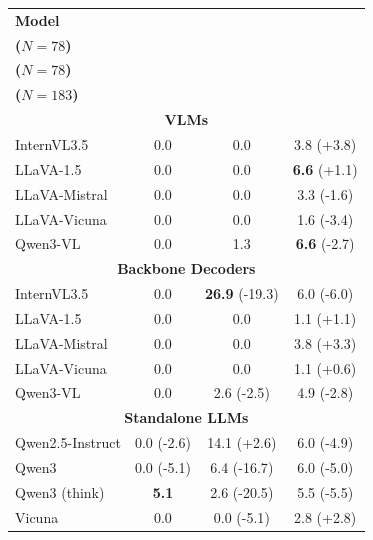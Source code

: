 \begin{center}
\small
\setlength{\tabcolsep}{3.5pt}
\renewcommand{\arraystretch}{0.93}
\begin{tabular}{lccc}
\toprule
\textbf{Model}
  & \makecell[c]{\textbf{Yes/No} \\ \textbf{($N{=}78$)}}
  & \makecell[c]{\textbf{Count} \\ \textbf{($N{=}78$)}}
  & \makecell[c]{\textbf{Free Text} \\ \textbf{($N{=}183$)}} \\
\midrule
\multicolumn{4}{c}{\textbf{VLMs}} \\
\midrule
InternVL3.5          & 0.0 & 0.0 & 3.8 {(\textcolor[HTML]{CC7A00}{+3.8})} \\
LLaVA-1.5            & 0.0 & 0.0 & \textbf{6.6} {(\textcolor[HTML]{CC7A00}{+1.1})} \\
LLaVA-Mistral        & 0.0 & 0.0 & 3.3 {(\textcolor[HTML]{0072B2}{-1.6})} \\
LLaVA-Vicuna         & 0.0 & 0.0 & 1.6 {(\textcolor[HTML]{0072B2}{-3.4})} \\
Qwen3-VL             & 0.0 & 1.3 & \textbf{6.6} {(\textcolor[HTML]{0072B2}{-2.7})} \\
\midrule
\multicolumn{4}{c}{\textbf{Backbone Decoders}} \\
\midrule
InternVL3.5          & 0.0 & \textbf{26.9} {(\textcolor[HTML]{0072B2}{-19.3})} & 6.0 {(\textcolor[HTML]{0072B2}{-6.0})} \\
LLaVA-1.5            & 0.0 & 0.0 & 1.1 {(\textcolor[HTML]{CC7A00}{+1.1})} \\
LLaVA-Mistral        & 0.0 & 0.0 & 3.8 {(\textcolor[HTML]{CC7A00}{+3.3})} \\
LLaVA-Vicuna         & 0.0 & 0.0 & 1.1 {(\textcolor[HTML]{CC7A00}{+0.6})} \\
Qwen3-VL             & 0.0 & 2.6 {(\textcolor[HTML]{0072B2}{-2.5})} & 4.9 {(\textcolor[HTML]{0072B2}{-2.8})} \\
\midrule
\multicolumn{4}{c}{\textbf{Standalone LLMs}} \\
\midrule
Qwen2.5-Instruct     & 0.0 {(\textcolor[HTML]{0072B2}{-2.6})} & 14.1 {(\textcolor[HTML]{CC7A00}{+2.6})} & 6.0 {(\textcolor[HTML]{0072B2}{-4.9})} \\
Qwen3                & 0.0 {(\textcolor[HTML]{0072B2}{-5.1})} & 6.4 {(\textcolor[HTML]{0072B2}{-16.7})} & 6.0 {(\textcolor[HTML]{0072B2}{-5.0})} \\
Qwen3 (think)        & \textbf{5.1} & 2.6 {(\textcolor[HTML]{0072B2}{-20.5})} & 5.5 {(\textcolor[HTML]{0072B2}{-5.5})} \\
Vicuna               & 0.0 & 0.0 {(\textcolor[HTML]{0072B2}{-5.1})} & 2.8 {(\textcolor[HTML]{CC7A00}{+2.8})} \\
\bottomrule
\end{tabular}
\label{tab:abstention_by_qtype}
\end{center}

